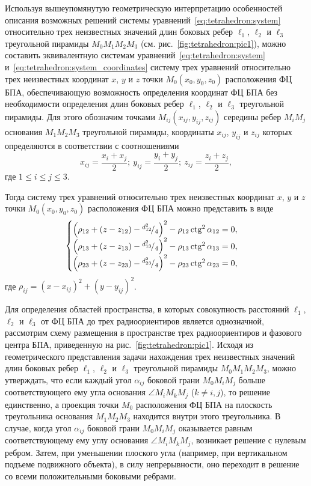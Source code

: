 \documentclass[../main.tex]{subfiles}
\begin{document}
Используя вышеупомянутую геометрическую интерпретацию особенностей описания возможных решений системы уравнений~\eqref{eq:tetrahedron:system} относительно трех неизвестных значений длин боковых ребер $\ell_1$, $\ell_2$ и $\ell_3$ треугольной пирамиды $M_0 M_1 M_2 M_3$ (см. рис.~\ref{fig:tetrahedron:pic1}), можно составить эквивалентную системам уравнений~\eqref{eq:tetrahedron:system} и~\eqref{eq:tetrahedron:system_coordinates} систему трех уравнений относительно трех неизвестных координат $x$, $y$ и $z$ точки $M_0\left(x_0, y_0, z_0\right)$ расположения ФЦ БПА, обеспечивающую возможность определения координат ФЦ БПА без необходимости определения длин боковых ребер $\ell_1$, $\ell_2$ и $\ell_3$ треугольной пирамиды. Для этого обозначим точками $M_{ij}\left(x_{ij}, y_{ij}, z_{ij}\right)$ середины ребер $M_i M_j$ основания $M_1 M_2 M_3$ треугольной пирамиды, координаты $x_{ij}$, $y_{ij}$ и $z_{ij}$ которых определяются в соответствии с соотношениями
\begin{equation*}
  x_{ij} = \frac{x_i + x_j}{2};\  y_{ij} = \frac{y_i + y_j}{2};\  z_{ij} = \frac{z_i + z_j}{2},
\end{equation*}
где $1 \le i \le j \le 3$.

Тогда систему трех уравнений относительно трех неизвестных координат $x$, $y$ и $z$ точки $M_0 \left(x_0, y_0, z_0\right)$ расположения ФЦ БПА можно представить в виде
\begin{equation*}
  \begin{cases}
    \left(\rho_{12} + \left(z - z_{12}\right) - {}^{d_{12}^2}\!/_{4}\right)^2 - \rho_{12}\operatorname{\text{ctg}}^2\alpha_{12} = 0, \\
    \left(\rho_{13} + \left(z - z_{13}\right) - {}^{d_{13}^2}\!/_{4}\right)^2 - \rho_{13}\operatorname{\text{ctg}}^2\alpha_{13} = 0, \\
    \left(\rho_{23} + \left(z - z_{23}\right) - {}^{d_{23}^2}\!/_{4}\right)^2 - \rho_{23}\operatorname{\text{ctg}}^2\alpha_{23} = 0,
  \end{cases}
\end{equation*}
где $\rho_{ij} = \left(x - x_{ij}\right)^2 + \left(y - y_{ij}\right)^2$.

Для определения областей пространства, в которых совокупность расстояний $\ell_1$, $\ell_2$ и $\ell_3$ от ФЦ БПА до трех радиоориентиров является однозначной, рассмотрим схему размещения в пространстве трех радиоориентиров и фазового центра БПА, приведенную на рис.~\ref{fig:tetrahedron:pic1}. Исходя из геометрического представления задачи нахождения трех неизвестных значений длин боковых ребер $\ell_1$, $\ell_2$ и $\ell_3$ треугольной пирамиды $M_0 M_1 M_2 M_3$, можно утверждать, что если каждый угол $\alpha_{ij}$ боковой грани $M_0 M_i M_j$ больше соответствующего ему угла основания $\angle M_i M_k M_j$ ($k \ne i,j$), то решение единственно, а проекция точки $M_0$ расположения ФЦ БПА на плоскость треугольника основания $M_1 M_2 M_3$ находится внутри этого треугольника. В случае, когда угол $\alpha_{ij}$ боковой грани $M_0 M_i M_j$ оказывается равным соответствующему ему углу основания $\angle M_i M_k M_j$, возникает решение с нулевым ребром. Затем, при уменьшении плоского угла (например, при вертикальном подъеме подвижного объекта), в силу непрерывности, оно переходит в решение со всеми положительными боковыми ребрами.
\end{document}
